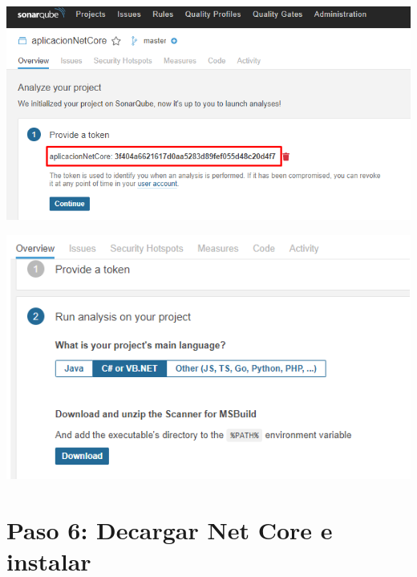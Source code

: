 \begin{center}
\includegraphics[width=\columnwidth]{images/8}\newline
\end{center}
\begin{center}
\includegraphics[width=\columnwidth]{images/9}\newline
\end{center}
\section{Paso 6: Decargar Net Core e instalar} 

